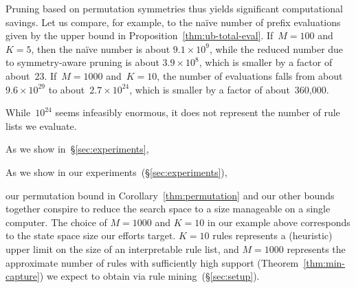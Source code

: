 Pruning based on permutation symmetries thus yields significant
computational savings.
%
Let us compare, for example, to the na\"ive number of prefix evaluations
given by the upper bound in Proposition~\ref{thm:ub-total-eval}.
%
If~${M = 100}$ and~${K = 5}$, then the na\"ive number is about
${9.1 \times 10^9}$, while the reduced number due to symmetry-aware
pruning is about ${3.9 \times 10^8}$,
which is smaller by a factor of about~23.
%
If~${M=1000}$ and~${K = 10}$, the number of evaluations falls from
about~${9.6 \times 10^{29}}$ to about~${2.7 \times 10^{24}}$,
which is smaller by a factor of about~360,000.
%
\begin{arxiv}

\end{arxiv}
\begin{kdd}
%
\end{kdd}
While~$10^{24}$ seems infeasibly enormous,
it does not represent the number of rule lists we evaluate.
%
\begin{kdd}
As we show in~\S\ref{sec:experiments},
\end{kdd}
\begin{arxiv}
As we show in our experiments~(\S\ref{sec:experiments}),
\end{arxiv}
our permutation bound in Corollary~\ref{thm:permutation}
and our other bounds together conspire to reduce the search space
to a size manageable on a single computer.
%
The choice of ${M=1000}$ and ${K=10}$ in our example above
corresponds to the state space size our efforts target.
%
${K=10}$ rules represents a (heuristic) upper limit on
the size of an interpretable rule list,
and ${M=1000}$ represents the approximate number of rules
with sufficiently high support (Theorem~\ref{thm:min-capture})
we expect to obtain via rule mining~(\S\ref{sec:setup}).

